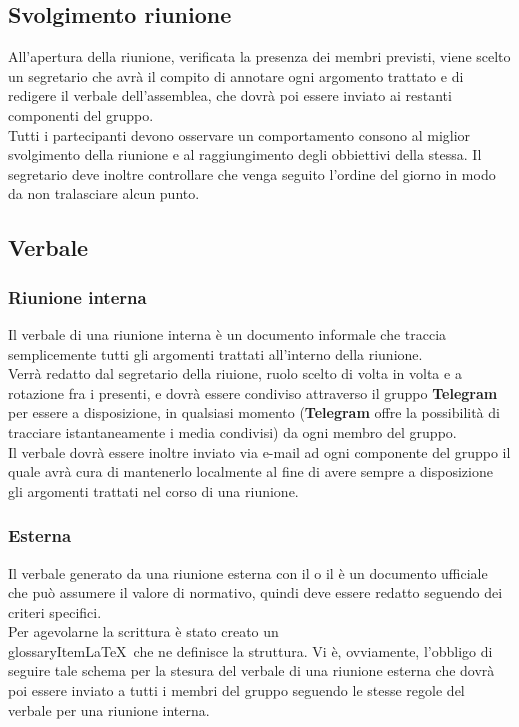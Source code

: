     \subsection{Svolgimento riunione}
      All’apertura della riunione, verificata la presenza dei membri previsti, viene scelto un segretario che avrà il compito di annotare ogni argomento trattato e di redigere il verbale
      dell’assemblea, che dovrà poi essere inviato ai restanti componenti del gruppo.\\
      Tutti i partecipanti devono osservare un comportamento consono al miglior svolgimento della riunione e al raggiungimento degli obbiettivi della stessa. Il segretario deve inoltre
      controllare che venga seguito l’ordine del giorno in modo da non tralasciare alcun punto.
    \subsection{Verbale}
      \subsubsection{Riunione interna}
        Il verbale di una riunione interna è un documento informale che traccia semplicemente tutti gli argomenti trattati all'interno della riunione.\\
        Verrà redatto dal segretario della riuione, ruolo scelto di volta in volta e a rotazione fra i presenti, e dovrà essere condiviso attraverso il gruppo \textbf{Telegram}
        per essere a disposizione, in qualsiasi momento (\textbf{Telegram} offre la possibilità di tracciare istantaneamente i media condivisi) da ogni membro del gruppo.\\
        Il verbale dovrà essere inoltre inviato via e-mail ad ogni componente del gruppo il quale avrà cura di mantenerlo localmente al fine di avere sempre a disposizione
        gli argomenti trattati nel corso di una riunione.
      \subsubsection{Esterna}
        Il verbale generato da una riunione esterna con il  o il  è un documento ufficiale che può assumere il valore di normativo, quindi deve essere redatto
        seguendo dei criteri specifici.\\
        Per agevolarne la scrittura è stato creato un  \\glossaryItem{LaTeX}\ che ne definisce la struttura.
        Vi è, ovviamente, l'obbligo di seguire tale schema per la stesura del verbale di una riunione esterna che dovrà poi essere inviato a tutti i membri del gruppo seguendo
        le stesse regole del verbale per una riunione interna.

